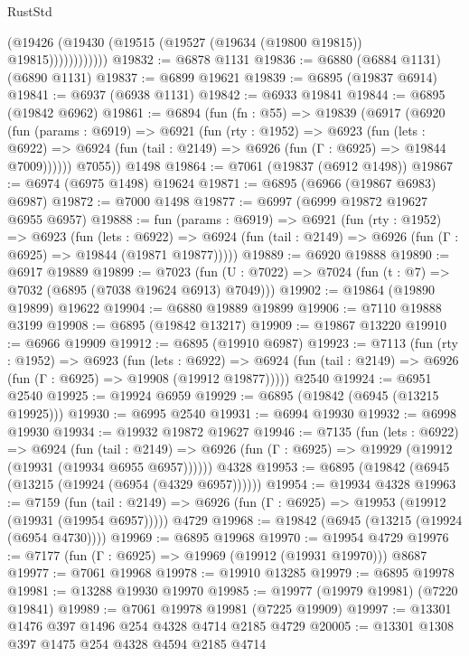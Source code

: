 \begin{lexlean}{RustStd}
\begin{coremodule}
                    (@19426 (@19430 (@19515 (@19527 (@19634 (@19800 @19815)) @19815))))))))))))
@19832 := @6878 @1131
@19836 := @6880 (@6884 @1131) (@6890 @1131)
@19837 := @6899 @19621
@19839 := @6895 (@19837 @6914)
@19841 := @6937 (@6938 @1131)
@19842 := @6933 @19841
@19844 := @6895 (@19842 @6962)
@19861 := @6894
    (fun (fn : @55) =>
    @19839
      (@6917
        (@6920
          (fun (params : @6919) =>
          @6921
            (fun (rty : @1952) =>
            @6923
              (fun (lets : @6922) =>
              @6924 (fun (tail : @2149) => @6926 (fun (Γ : @6925) => @19844 @7009))))))
        @7055))
    @1498
@19864 := @7061 (@19837 (@6912 @1498))
@19867 := @6974 (@6975 @1498) @19624
@19871 := @6895 (@6966 (@19867 @6983) @6987)
@19872 := @7000 @1498
@19877 := @6997 (@6999 @19872 @19627 @6955 @6957)
@19888 := fun (params : @6919) =>
  @6921
    (fun (rty : @1952) =>
    @6923
      (fun (lets : @6922) =>
      @6924 (fun (tail : @2149) => @6926 (fun (Γ : @6925) => @19844 (@19871 @19877)))))
@19889 := @6920 @19888
@19890 := @6917 @19889
@19899 := @7023
    (fun (U : @7022) => @7024 (fun (t : @7) => @7032 (@6895 (@7038 @19624 @6913) @7049)))
@19902 := @19864 (@19890 @19899) @19622
@19904 := @6880 @19889 @19899
@19906 := @7110 @19888 @3199
@19908 := @6895 (@19842 @13217)
@19909 := @19867 @13220
@19910 := @6966 @19909
@19912 := @6895 (@19910 @6987)
@19923 := @7113
    (fun (rty : @1952) =>
    @6923
      (fun (lets : @6922) =>
      @6924 (fun (tail : @2149) => @6926 (fun (Γ : @6925) => @19908 (@19912 @19877)))))
    @2540
@19924 := @6951 @2540
@19925 := @19924 @6959
@19929 := @6895 (@19842 (@6945 (@13215 @19925)))
@19930 := @6995 @2540
@19931 := @6994 @19930
@19932 := @6998 @19930
@19934 := @19932 @19872 @19627
@19946 := @7135
    (fun (lets : @6922) =>
    @6924
      (fun (tail : @2149) =>
      @6926 (fun (Γ : @6925) => @19929 (@19912 (@19931 (@19934 @6955 @6957))))))
    @4328
@19953 := @6895 (@19842 (@6945 (@13215 (@19924 (@6954 (@4329 @6957))))))
@19954 := @19934 @4328
@19963 := @7159
    (fun (tail : @2149) => @6926 (fun (Γ : @6925) => @19953 (@19912 (@19931 (@19954 @6957)))))
    @4729
@19968 := @19842 (@6945 (@13215 (@19924 (@6954 @4730))))
@19969 := @6895 @19968
@19970 := @19954 @4729
@19976 := @7177 (fun (Γ : @6925) => @19969 (@19912 (@19931 @19970))) @8687
@19977 := @7061 @19968
@19978 := @19910 @13285
@19979 := @6895 @19978
@19981 := @13288 @19930 @19970
@19985 := @19977 (@19979 @19981) (@7220 @19841)
@19989 := @7061 @19978 @19981 (@7225 @19909)
@19997 := @13301 @1476 @397 @1496 @254 @4328 @4714 @2185 @4729
@20005 := @13301 @1308 @397 @1475 @254 @4328 @4594 @2185 @4714

\end{coremodule}
\end{lexlean}
